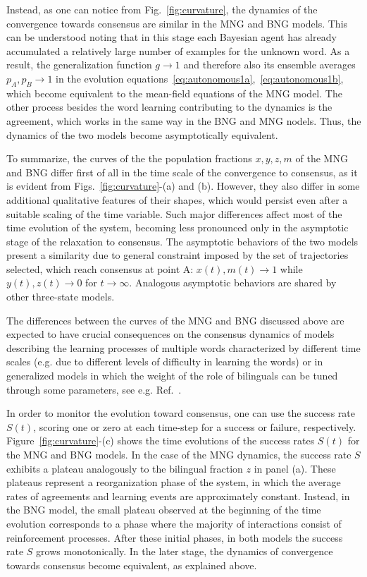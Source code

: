 \documentclass[review]{elsarticle}
\newcommand{\+}{\! + \!}
\begin{document}
Instead, as one can notice from Fig.~\ref{fig:curvature}, the dynamics of the convergence towards consensus are similar in the MNG and BNG models.
This can be understood noting that in this stage each Bayesian agent has already accumulated a relatively large number of examples for the unknown word. As a result, the generalization function $g \to 1$ and therefore also its ensemble averages $p_A,p_B \to 1$ in the evolution equations~\eqref{eq:autonomous1a},~\eqref{eq:autonomous1b}, which become equivalent to the mean-field equations of the MNG model.
The other process besides the word learning contributing to the dynamics is the agreement, which works in the same way in the BNG and MNG nodels. 
Thus, the dynamics of the two models become asymptotically equivalent.


To summarize, the curves of the the population fractions $x,y,z,m$ of the MNG and BNG differ first of all in the time scale of the convergence to consensus, as it is evident from Figs.~\ref{fig:curvature}-(a) and (b).
However, they also differ in some additional qualitative features of their shapes, which would persist even after a suitable scaling of the time variable.
Such major differences affect most of the time evolution of the system, becoming less pronounced only in the asymptotic stage of the relaxation to consensus.
The asymptotic behaviors of the two models present a similarity due to general constraint imposed by the set of trajectories selected, which reach consensus at point A: $x(t), m(t) \to 1$ while $y(t), z(t) \to 0$ for $t \to \infty$. 
Analogous asymptotic behaviors are shared by other three-state models.


The differences between the curves of the MNG and BNG discussed above are expected to have crucial consequences on the consensus dynamics of models describing the learning processes of multiple words characterized by different time scales (e.g. due to different levels of difficulty in learning the words) or in generalized models in which the weight of the role of bilinguals can be tuned through some parameters, see e.g. Ref.~\cite{Heinsalu-2014a}.


In order to monitor the evolution toward consensus, one can use the success rate $S(t)$, scoring one or zero at each time-step for a success or failure, respectively.
Figure~\ref{fig:curvature}-(c) shows the time evolutions of the success rates $S(t)$ for the MNG and BNG models. 
In the case of the MNG dynamics, the success rate $S$ exhibits a plateau analogously to the bilingual fraction $z$ in panel (a). 
These plateaus represent a reorganization phase of the system, in which the average rates of agreements and learning events are approximately constant.
Instead, in the BNG model, the small plateau observed at the beginning of the time evolution corresponds to a phase where  the majority of interactions consist of reinforcement processes.
After these initial phases, in both models the success rate $S$ grows monotonically.
In the later stage, the dynamics of convergence towards consensus become equivalent, as explained above.
\end{document}

